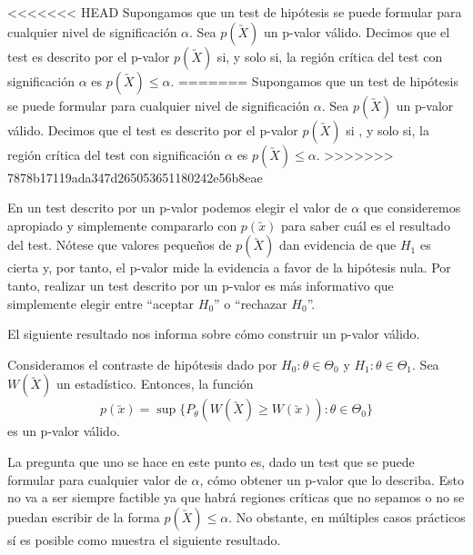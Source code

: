         \begin{definition}
<<<<<<< HEAD
            Supongamos que un test de hipótesis se puede formular para cualquier nivel de significación $\alpha$. Sea $p(\utilde{X})$ un p-valor válido. Decimos que el test es descrito por el p-valor $p(\utilde{X})$ si, y solo si, la región crítica del test con significación $\alpha$ es $p(\utilde{X}) \le \alpha$.
=======
            Supongamos que un test de hipótesis se puede formular para cualquier nivel de significación $\alpha$. Sea $p(\utilde{X})$ un p-valor válido. Decimos que el test es descrito por el p-valor $p(\utilde{X})$ si , y solo si, la región crítica del test con significación $\alpha$ es $p(\utilde{X}) \le \alpha$.
>>>>>>> 7878b17119ada347d265053651180242e56b8eae
        \end{definition}

        En un test descrito por un p-valor podemos elegir el valor de $\alpha$ que consideremos apropiado y simplemente compararlo con $p(\utilde{x})$ para saber cuál es el resultado del test. Nótese que valores pequeños de $p(\utilde{X})$ dan evidencia de que $H_1$ es cierta y, por tanto, el p-valor mide la evidencia a favor de la hipótesis nula. Por tanto, realizar un test descrito por un p-valor es más informativo que simplemente elegir entre ``aceptar $H_0$'' o ``rechazar $H_0$''.

        El siguiente resultado nos informa sobre cómo construir un p-valor válido.

        \begin{thm} \label{thm:p-valor}
            Consideramos el contraste de hipótesis dado por $H_0: \theta \in \Theta_0$ y $H_1: \theta \in \Theta_1$. Sea $W(\utilde{X})$ un estadístico. Entonces, la función
            \[p(\utilde{x}) = \sup\{P_\theta(W(\utilde{X}) \ge W(\utilde{x})): \theta \in \Theta_0\}\]
            es un p-valor válido.
        \end{thm}

        La pregunta que uno se hace en este punto es, dado un test que se puede formular para cualquier valor de $\alpha$, cómo obtener un p-valor que lo describa. Esto no va a ser siempre factible ya que habrá regiones críticas que no sepamos o no se puedan escribir de la forma $p(\utilde{X}) \le \alpha$. No obstante, en múltiples casos prácticos sí es posible como muestra el siguiente resultado. %

